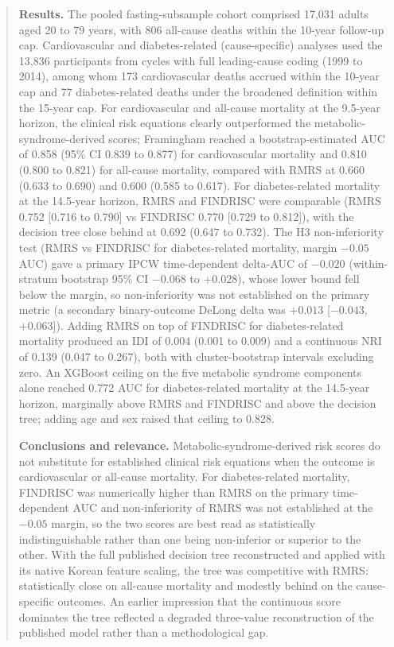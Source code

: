 \documentclass[11pt]{article}
\begin{document}
\begin{abstract}
\noindent \textbf{Results.} The pooled fasting-subsample cohort comprised 17{,}031 adults aged 20 to 79 years, with 806 all-cause deaths within the 10-year follow-up cap. Cardiovascular and diabetes-related (cause-specific) analyses used the 13{,}836 participants from cycles with full leading-cause coding (1999 to 2014), among whom 173 cardiovascular deaths accrued within the 10-year cap and 77 diabetes-related deaths under the broadened definition within the 15-year cap. For cardiovascular and all-cause mortality at the 9.5-year horizon, the clinical risk equations clearly outperformed the metabolic-syndrome-derived scores; Framingham reached a bootstrap-estimated AUC of 0.858 (95\% CI 0.839 to 0.877) for cardiovascular mortality and 0.810 (0.800 to 0.821) for all-cause mortality, compared with RMRS at 0.660 (0.633 to 0.690) and 0.600 (0.585 to 0.617). For diabetes-related mortality at the 14.5-year horizon, RMRS and FINDRISC were comparable (RMRS 0.752 [0.716 to 0.790] vs FINDRISC 0.770 [0.729 to 0.812]), with the decision tree close behind at 0.692 (0.647 to 0.732). The H3 non-inferiority test (RMRS vs FINDRISC for diabetes-related mortality, margin $-0.05$ AUC) gave a primary IPCW time-dependent delta-AUC of $-0.020$ (within-stratum bootstrap 95\% CI $-0.068$ to $+0.028$), whose lower bound fell below the margin, so non-inferiority was not established on the primary metric (a secondary binary-outcome DeLong delta was $+0.013$ [$-0.043$, $+0.063$]). Adding RMRS on top of FINDRISC for diabetes-related mortality produced an IDI of 0.004 (0.001 to 0.009) and a continuous NRI of 0.139 (0.047 to 0.267), both with cluster-bootstrap intervals excluding zero. An XGBoost ceiling on the five metabolic syndrome components alone reached 0.772 AUC for diabetes-related mortality at the 14.5-year horizon, marginally above RMRS and FINDRISC and above the decision tree; adding age and sex raised that ceiling to 0.828.

\noindent \textbf{Conclusions and relevance.} Metabolic-syndrome-derived risk scores do not substitute for established clinical risk equations when the outcome is cardiovascular or all-cause mortality. For diabetes-related mortality, FINDRISC was numerically higher than RMRS on the primary time-dependent AUC and non-inferiority of RMRS was not established at the $-0.05$ margin, so the two scores are best read as statistically indistinguishable rather than one being non-inferior or superior to the other. With the full published decision tree reconstructed and applied with its native Korean feature scaling, the tree was competitive with RMRS: statistically close on all-cause mortality and modestly behind on the cause-specific outcomes. An earlier impression that the continuous score dominates the tree reflected a degraded three-value reconstruction of the published model rather than a methodological gap.
\end{abstract}
\end{document}
